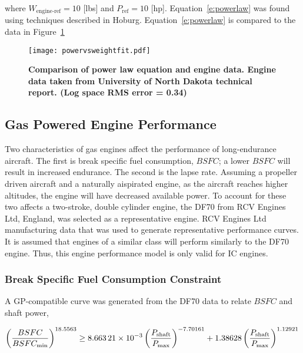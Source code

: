 \documentclass[]{aiaa-tc}%
\begin{document}
where $W_{\text{engine-ref}} = 10$ [lbs] and $P_{\text{ref}} = 10$ [hp].  Equation~\eqref{e:powerlaw} was found using techniques described in Hoburg\cite{fitting}. Equation~\eqref{e:powerlaw} is compared to the data in Figure~\ref{f:powervsweightfit}

\begin{figure}[H]
	\begin{center}
	\texttt{[image: powervsweightfit.pdf]}
    \caption{ \textbf{ Comparison of power law equation and engine data.  Engine data taken from University of North Dakota technical report.\cite{gasengine} (Log space RMS error = 0.34)}}
	\label{f:powervsweightfit}
	\end{center}
\end{figure}

\subsection{Gas Powered Engine Performance}

Two characteristics of gas engines affect the performance of long-endurance aircraft.  
The first is break specific fuel consumption, $BSFC$; a lower $BSFC$ will result in increased endurance.  
The second is the lapse rate.  
Assuming a propeller driven aircraft and a naturally aispirated engine, as the aircraft reaches higher altitudes, the engine will have decreased available power. 
To account for these two affects a two-stroke, double cylinder engine, the DF70 from RCV Engines Ltd, England, was selected as a representative engine.  
RCV Engines Ltd manufacturing data that was used to generate representative performance curves.\cite{rcvengines}
It is assumed that engines of a similar class will perform similarly to the DF70 engine.  
Thus, this engine performance model is only valid for IC engines.

\subsubsection{Break Specific Fuel Consumption Constraint}

A GP-compatible curve was generated from the DF70 data to relate $BSFC$ and shaft power, 

\begin{equation}
    \label{e:rpmtobsfc}
    \left( \frac{BSFC}{BSFC_{\text{min}}} \right)^{18.5563} \geq \num{8.66321d-3}\left( \frac{P_{\text{shaft}}}{P_{\text{max}}}\right)^{-7.70161} + 1.38628\left( \frac{P_{\text{shaft}}}{P_{\text{max}}} \right)^{1.12921} \\
\end{equation}
\end{document}
